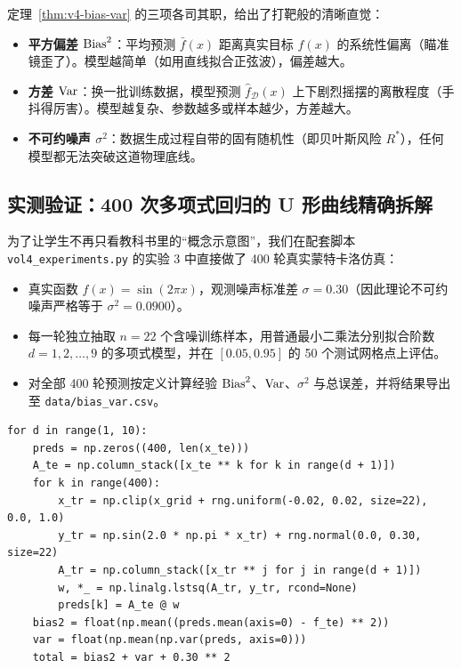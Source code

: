 定理~\ref{thm:v4-bias-var} 的三项各司其职，给出了打靶般的清晰直觉：
\begin{itemize}
  \item \textbf{平方偏差 $\operatorname{Bias}^2$}：平均预测 $\bar{f}(x)$ 距离真实目标 $f(x)$ 的系统性偏离（瞄准镜歪了）。模型越简单（如用直线拟合正弦波），偏差越大。
  \item \textbf{方差 $\operatorname{Var}$}：换一批训练数据，模型预测 $\hat{f}_{\mathcal{D}}(x)$ 上下剧烈摇摆的离散程度（手抖得厉害）。模型越复杂、参数越多或样本越少，方差越大。
  \item \textbf{不可约噪声 $\sigma^2$}：数据生成过程自带的固有随机性（即贝叶斯风险 $R^*$），任何模型都无法突破这道物理底线。
\end{itemize}

\subsection{实测验证：400 次多项式回归的 U 形曲线精确拆解}

为了让学生不再只看教科书里的“概念示意图”，我们在配套脚本 \texttt{vol4\_experiments.py} 的实验 3 中直接做了 400 轮真实蒙特卡洛仿真：
\begin{itemize}
  \item 真实函数 $f(x) = \sin(2\pi x)$，观测噪声标准差 $\sigma = 0.30$（因此理论不可约噪声严格等于 $\sigma^2 = 0.0900$）。
  \item 每一轮独立抽取 $n = 22$ 个含噪训练样本，用普通最小二乘法分别拟合阶数 $d = 1, 2, \dots, 9$ 的多项式模型，并在 $[0.05, 0.95]$ 的 50 个测试网格点上评估。
  \item 对全部 400 轮预测按定义计算经验 $\operatorname{Bias}^2$、$\operatorname{Var}$、$\sigma^2$ 与总误差，并将结果导出至 \texttt{data/bias\_var.csv}。
\end{itemize}

\begin{lstlisting}[caption={400 轮蒙特卡洛多项式回归偏差-方差分解（节选自 \texttt{vol4\_experiments.py}）},label={lst:v4-ch3-bv}]
for d in range(1, 10):
    preds = np.zeros((400, len(x_te)))
    A_te = np.column_stack([x_te ** k for k in range(d + 1)])
    for k in range(400):
        x_tr = np.clip(x_grid + rng.uniform(-0.02, 0.02, size=22), 0.0, 1.0)
        y_tr = np.sin(2.0 * np.pi * x_tr) + rng.normal(0.0, 0.30, size=22)
        A_tr = np.column_stack([x_tr ** j for j in range(d + 1)])
        w, *_ = np.linalg.lstsq(A_tr, y_tr, rcond=None)
        preds[k] = A_te @ w
    bias2 = float(np.mean((preds.mean(axis=0) - f_te) ** 2))
    var = float(np.mean(np.var(preds, axis=0)))
    total = bias2 + var + 0.30 ** 2
\end{lstlisting}

